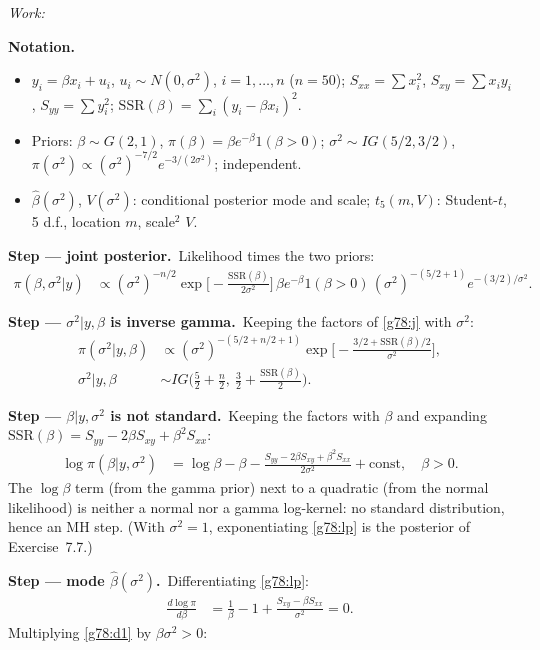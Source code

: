 \documentclass[11pt,a4paper]{article}
\newif\ifsolucoes
\newcommand{\espacoresol}{4.5cm}   %
\newenvironment{notacao}{\par\smallskip\noindent\textbf{Notation.}\begin{itemize}[leftmargin=1.4em,topsep=1pt,itemsep=0pt]\small}{\end{itemize}}
\newcommand{\resolespaco}{\ifsolucoes\else\par\textit{Work:}\vspace{\espacoresol}\par\fi}
\newcommand{\passo}[2]{\par\smallskip\noindent\textbf{Step --- #1.}~#2}
\begin{document}
\resolespaco
\begin{sol}
\begin{notacao}
\item $y_i=\beta x_i+u_i$, $u_i\sim N(0,\sigma^2)$, $i=1,\ldots,n$ ($n=50$); $S_{xx}=\sum x_i^2$, $S_{xy}=\sum x_iy_i$, $S_{yy}=\sum y_i^2$; $\mathrm{SSR}(\beta)=\sum_i(y_i-\beta x_i)^2$.
\item Priors: $\beta\sim G(2,1)$, $\pi(\beta)=\beta e^{-\beta}1(\beta>0)$; $\sigma^2\sim IG(5/2,3/2)$, $\pi(\sigma^2)\propto(\sigma^2)^{-7/2}e^{-3/(2\sigma^2)}$; independent.
\item $\hat\beta(\sigma^2)$, $V(\sigma^2)$: conditional posterior mode and scale; $t_5(m,V)$: Student-$t$, 5 d.f., location $m$, scale$^2$ $V$.
\end{notacao}
\passo{joint posterior}{Likelihood times the two priors:
\begin{align}
\pi(\beta,\sigma^2|y)&\propto(\sigma^2)^{-n/2}\exp\Big[-\frac{\mathrm{SSR}(\beta)}{2\sigma^2}\Big]\,\beta e^{-\beta}1(\beta>0)\,(\sigma^2)^{-(5/2+1)}e^{-(3/2)/\sigma^2}.\label{g78:j}
\end{align}}
\passo{$\sigma^2|y,\beta$ is inverse gamma}{Keeping the factors of \eqref{g78:j} with $\sigma^2$:
\begin{align}
\pi(\sigma^2|y,\beta)&\propto(\sigma^2)^{-(5/2+n/2+1)}\exp\Big[-\frac{3/2+\mathrm{SSR}(\beta)/2}{\sigma^2}\Big],\label{g78:s1}\\
\sigma^2|y,\beta&\sim IG\Big(\frac52+\frac n2,\ \frac32+\frac{\mathrm{SSR}(\beta)}{2}\Big).\label{g78:s2}
\end{align}}
\passo{$\beta|y,\sigma^2$ is not standard}{Keeping the factors with $\beta$ and expanding $\mathrm{SSR}(\beta)=S_{yy}-2\beta S_{xy}+\beta^2S_{xx}$:
\begin{align}
\log\pi(\beta|y,\sigma^2)&=\log\beta-\beta-\frac{S_{yy}-2\beta S_{xy}+\beta^2S_{xx}}{2\sigma^2}+\text{const},\quad\beta>0.\label{g78:lp}
\end{align}
The $\log\beta$ term (from the gamma prior) next to a quadratic (from the normal likelihood) is neither a normal nor a gamma log-kernel: no standard distribution, hence an MH step. (With $\sigma^2=1$, exponentiating \eqref{g78:lp} is the posterior of Exercise~7.7.)}
\passo{mode $\hat\beta(\sigma^2)$}{Differentiating \eqref{g78:lp}:
\begin{align}
\frac{d\log\pi}{d\beta}&=\frac1\beta-1+\frac{S_{xy}-\beta S_{xx}}{\sigma^2}=0.\label{g78:d1}
\end{align}
Multiplying \eqref{g78:d1} by $\beta\sigma^2>0$:
}
\end{sol}
\end{document}

